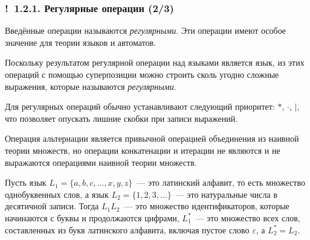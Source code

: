 \documentclass[mathserif,12pt,aspectratio=169]{beamer}
\renewcommand{\index}[1]{}
\def\odmkey#1#2{{\it\color{red} #1}\index{#2}}
\def\Ok{{\color{green}\textbf{!}\ }}
\begin{document}
\begin{frame}
\frametitle{\Ok 1.2.1. Регулярные операции (2/3)}

Введённые операции называются
\odmkey{регулярными}{Операция!регулярная}. Эти операции имеют
особое значение для теории языков и автоматов.

\medskip
Поскольку результатом регулярной 
операции над языками является язык,
из этих операций с помощью суперпозиции 
можно строить
сколь угодно сложные  выражения,
которые называются \odmkey{регулярными}{Выражение!регулярное}. 

\medskip
Для регулярных операций обычно устанавливают следующий приоритет:
$*$, $\cdot$, $|$, что позволяет опускать лишние скобки при записи
выражений.

\begin{remark}
Операция альтернации является
привычной операцией объединения из
наивной теории множеств,
но операции конкатенации и итерации
не являются 
и не выражаются операциями наивной теории множеств. 
\end{remark}

\begin{examples}
Пусть язык 
$L_1 =\{a,b,c,\dots,x,y,z\}$~--- это латинский алфавит, то есть множество однобуквенных слов,
а язык 
$L_2=\{1,2,3,\dots\}$~--- это натуральные
числа в десятичной записи.
Тогда $L_1 L_2$~--- это множество 
идентификаторов, которые начинаются
с буквы и продолжаются цифрами,
$L_1^*$~--- это множество всех 
слов, составленных из букв латинского алфавита,
включая пустое слово $\varepsilon$,
а $L_2^* = L_2$.
\end{examples}

\end{frame}
\end{document}
